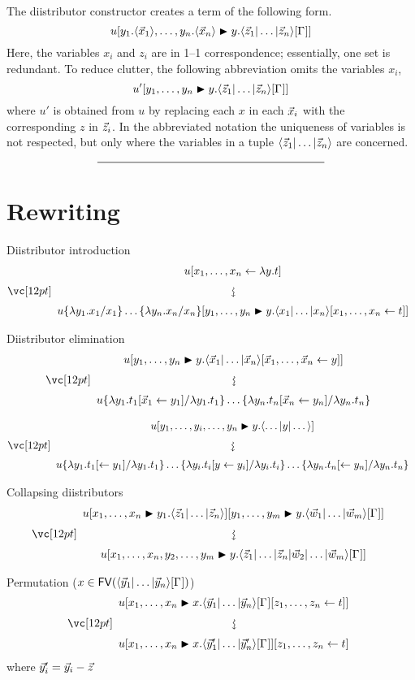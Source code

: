 \documentclass{amsart}
\begin{document}


The diistributor constructor creates a term of the following form.
\[
	u\diistr*{y_1.\tup*{\vv*x_1},\ldots,y_n.\tup*{\vv*x_n}}y{\ttup*z\G}
\]
Here, the variables $x_i$ and $z_i$ are in 1--1 correspondence; essentially, one set is redundant.
%
To reduce clutter, the following abbreviation omits the variables $x_i$,
\[
	u'\diistr yy{\ttup*z\G}
\]
where $u'$ is obtained from $u$ by replacing each $x$ in each $\vv*x_i$ with the corresponding $z$ in $\vv*z_i$.
%
In the abbreviated notation the uniqueness of variables is not respected, but only where the variables in a tuple $\ttup*z$ are concerned.


\[
	\rule{200pt}{.5pt}
\]


\section*{Rewriting}

\noindent
Diistributor introduction
\[
\displayrewrite
  { u\share x{\lambda y.t} }
  { u\subsabs xyx\diistr yy{\ttup x\share xt} }
\]

\bigskip
\bigskip
\bigskip

\noindent
Diistributor elimination
\[
\displayrewrite
  { u\diistr yy{\ttup*x\share{\vv*x}y} }
  { u\sub{\lambda y_1.t_1}{\lambda y_1.t_1\share*{\vv*x_1}{y_1}} \dotso
     \sub{\lambda y_n.t_n}{\lambda y_n.t_n\share*{\vv*x_n}{y_n}} }
\]

\bigskip

\[
\displayrewrite
  { u\diistr*{y_1,\dotsc,y_i,\dotsc,y_n}y{\tup*{\dotso|y|\dotso}} }
  { u\sub{\lambda y_1.t_1}{\lambda y_1.t_1\share*{}{y_1}} \dotso
     \sub{\lambda y_i.t_i}{\lambda y_i.t_i\share*{y}{y_i}} \dotso
     \sub{\lambda y_n.t_n}{\lambda y_n.t_n\share*{}{y_n}} }
\]

\bigskip
\bigskip
\bigskip

\noindent
Collapsing diistributors
\[
\displayrewrite
  { u\diistr x{y_1}{\ttup*z}\diistr[m]yy{\ttup*[m]w\G} }
  { u\diistr*{\vv x,y_2,\dotsc,y_m}y{\tup*{\vv*z_1|\dotso|\vv*z_n|\vv*w_2|\dotso|\vv*w_m}\G} }
\]


\bigskip
\bigskip
\bigskip

\noindent
Permutation ($x\in\FV(\ttup*y\G)$)
\[
\displayrewrite
  { u\diistr xx{\ttup*y\G\share zt} }
  { u\diistr xx{\ttup{\vv*y'}\G}\share zt }
\]
where $\vv*y'_i=\vv*y_i-\vv*z$
\end{document}
